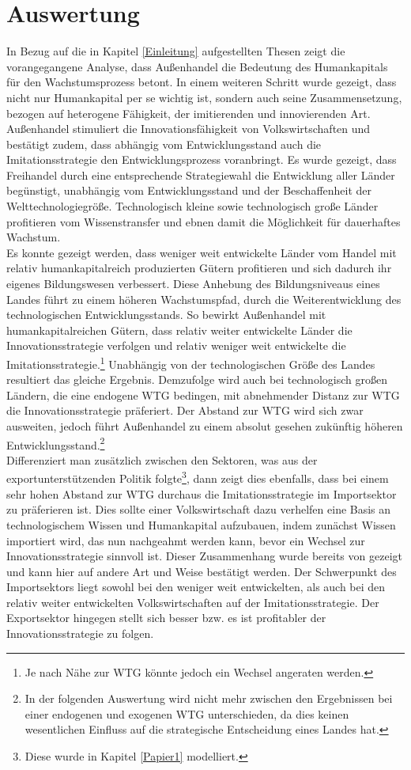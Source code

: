 \chapter{Auswertung}\label{Auswertung}
%
In Bezug auf die in Kapitel \ref{Einleitung} aufgestellten Thesen zeigt die vorangegangene Analyse, dass Außenhandel die Bedeutung des Humankapitals für den Wachstumsprozess betont. In einem weiteren Schritt wurde gezeigt, dass nicht nur Humankapital per se wichtig ist, sondern auch seine Zusammensetzung,  bezogen auf heterogene Fähigkeit, der imitierenden und innovierenden Art. Außenhandel stimuliert die Innovationsfähigkeit von Volkswirtschaften und bestätigt zudem, dass abhängig vom Entwicklungsstand auch die Imitationsstrategie den Entwicklungsprozess voranbringt. Es wurde gezeigt, dass Freihandel durch eine entsprechende Strategiewahl die Entwicklung aller Länder begünstigt, unabhängig vom Entwicklungsstand und der Beschaffenheit der Welttechnologiegröße. Technologisch kleine sowie technologisch große Länder profitieren vom Wissenstransfer und ebnen damit die Möglichkeit für dauerhaftes Wachstum.\\
%
Es konnte gezeigt werden, dass weniger weit entwickelte Länder vom Handel mit relativ humankapitalreich produzierten Gütern profitieren und sich dadurch ihr eigenes Bildungswesen verbessert. Diese Anhebung des Bildungsniveaus eines Landes führt zu einem höheren Wachstumspfad, durch die Weiterentwicklung des technologischen Entwicklungsstands. So bewirkt Außenhandel mit humankapitalreichen Gütern, dass relativ weiter entwickelte Länder die Innovationsstrategie verfolgen und relativ weniger weit entwickelte die Imitationsstrategie.\footnote{Je nach Nähe zur WTG könnte jedoch ein Wechsel angeraten werden.} Unabhängig von der technologischen Größe des Landes resultiert das gleiche Ergebnis. Demzufolge wird auch bei technologisch großen Ländern, die eine endogene WTG bedingen, mit abnehmender Distanz zur WTG die Innovationsstrategie präferiert. Der Abstand zur WTG wird sich zwar ausweiten, jedoch führt Außenhandel zu einem absolut gesehen zukünftig höheren Entwicklungsstand.\footnote{In der folgenden Auswertung wird nicht mehr zwischen den Ergebnissen bei einer endogenen und exogenen WTG unterschieden, da dies keinen wesentlichen Einfluss auf die strategische Entscheidung eines Landes hat.}\\
%
Differenziert man zusätzlich zwischen den Sektoren, was aus der exportunterstützenden Politik folgte\footnote{Diese wurde in Kapitel \ref{Papier1} modelliert.}, dann zeigt dies ebenfalls, dass bei einem sehr hohen Abstand zur WTG durchaus die Imitationsstrategie im Importsektor zu präferieren ist. Dies sollte einer Volkswirtschaft dazu verhelfen eine Basis an technologischem Wissen und Humankapital aufzubauen, indem zunächst Wissen importiert wird, das nun nachgeahmt werden kann, bevor ein Wechsel zur Innovationsstrategie sinnvoll ist. Dieser Zusammenhang wurde bereits von \cite{Glass.1999} gezeigt und kann hier auf andere Art und Weise bestätigt werden. Der Schwerpunkt des Importsektors liegt sowohl bei den weniger weit entwickelten, als auch bei den relativ weiter entwickelten Volkswirtschaften auf der Imitationsstrategie. Der Exportsektor hingegen stellt sich besser bzw. es ist profitabler der Innovationsstrategie zu folgen.\\ 
